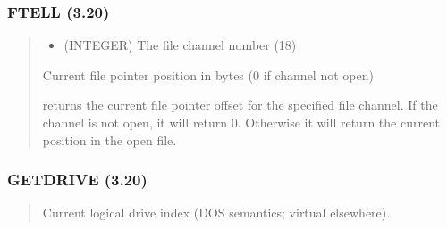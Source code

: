 \documentclass[letterpaper,10pt,english]{sphinxmanual}
\begin{document}
\subsubsection{FTELL (3.20)}
\label{\detokenize{ppl:ftell-3-20}}\begin{quote}

\sphinxAtStartPar
{}
\begin{description}
\begin{itemize}
\item {} 
\sphinxAtStartPar
{} (INTEGER) \sphinxhyphen{} The file channel number (1\sphinxhyphen{}8)

\end{itemize}

\sphinxAtStartPar
Current file pointer position in bytes (0 if channel not open)

\sphinxAtStartPar
{} returns the current file pointer offset for the specified
file channel. If the channel is not open, it will return 0.
Otherwise it will return the current position in the open file.

\end{description}

\sphinxAtStartPar
{}
\begin{quote}

\begin{sphinxVerbatim}[commandchars=\\\{\}]
 
 
 
 
\end{sphinxVerbatim}
\end{quote}
\end{quote}


\subsubsection{GETDRIVE (3.20)}
\label{\detokenize{ppl:getdrive-3-20}}\begin{quote}

\sphinxAtStartPar
{}
\begin{description}
\sphinxAtStartPar
Current logical drive index (DOS semantics; virtual elsewhere).

\end{description}
\end{quote}
\end{document}

